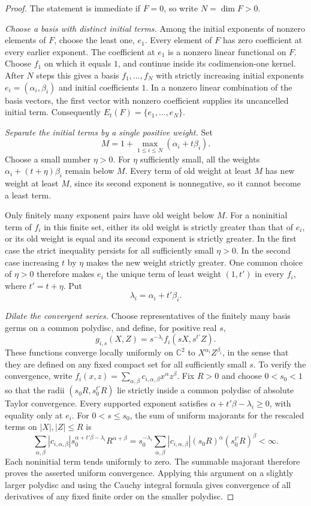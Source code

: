 \begin{proof}
The statement is immediate if $F=0$, so write $N=\dim F>0$.

\emph{Choose a basis with distinct initial terms.} Among the initial exponents of nonzero elements of $F$, choose the least one, $e_1$.  Every element of $F$ has zero coefficient at every earlier exponent.  The coefficient at $e_1$ is a nonzero linear functional on $F$.  Choose $f_1$ on which it equals $1$, and continue inside its codimension-one kernel.  After $N$ steps this gives a basis $f_1,\ldots,f_N$ with strictly increasing initial exponents $e_i=(\alpha_i,\beta_i)$ and initial coefficients $1$.  In a nonzero linear combination of the basis vectors, the first vector with nonzero coefficient supplies its uncancelled initial term.  Consequently $E_t(F)=\{e_1,\ldots,e_N\}$.

\emph{Separate the initial terms by a single positive weight.} Set
\[
 M=1+\max_{1\le i\le N}(\alpha_i+t\beta_i).
\]
Choose a small number $\eta>0$.  For $\eta$ sufficiently small, all the weights $\alpha_i+(t+\eta)\beta_i$ remain below $M$.  Every term of old weight at least $M$ has new weight at least $M$, since its second exponent is nonnegative, so it cannot become a least term.

Only finitely many exponent pairs have old weight below $M$.  For a noninitial term of $f_i$ in this finite set, either its old weight is strictly greater than that of $e_i$, or its old weight is equal and its second exponent is strictly greater.  In the first case the strict inequality persists for all sufficiently small $\eta>0$.  In the second case increasing $t$ by $\eta$ makes the new weight strictly greater. One common choice of $\eta>0$ therefore makes $e_i$ the unique term of least weight $(1,t')$ in every $f_i$, where $t'=t+\eta$.  Put
\[
 \lambda_i=\alpha_i+t'\beta_i.
\]

\emph{Dilate the convergent series.} Choose representatives of the finitely many basis germs on a common polydisc, and define, for positive real $s$,
\[
 g_{i,s}(X,Z)=s^{-\lambda_i}f_i(sX,s^{t'}Z).
\]
These functions converge locally uniformly on $\mathbb{C}^2$ to $X^{\alpha_i}Z^{\beta_i}$, in the sense that they are defined on any fixed compact set for all sufficiently small $s$.  To verify the convergence, write $f_i(x,z)=\sum_{\alpha,\beta}c_{i,\alpha,\beta}x^\alpha z^\beta$. Fix $R>0$ and choose $0<s_0<1$ so that the radii $(s_0R,s_0^{t'}R)$ lie strictly inside a common polydisc of absolute Taylor convergence.  Every supported exponent satisfies $\alpha+t'\beta-\lambda_i\ge0$, with equality only at $e_i$. For $0<s\le s_0$, the sum of uniform majorants for the rescaled terms on $|X|,|Z|\le R$ is
\[
 \sum_{\alpha,\beta}
 |c_{i,\alpha,\beta}|s_0^{\alpha+t'\beta-\lambda_i}R^{\alpha+\beta}
 =s_0^{-\lambda_i}
   \sum_{\alpha,\beta}|c_{i,\alpha,\beta}|
     (s_0R)^\alpha(s_0^{t'}R)^\beta
 <\infty.
\]
Each noninitial term tends uniformly to zero.  The summable majorant therefore proves the asserted uniform convergence.  Applying this argument on a slightly larger polydisc and using the Cauchy integral formula gives convergence of all derivatives of any fixed finite order on the smaller polydisc.


\end{proof}
